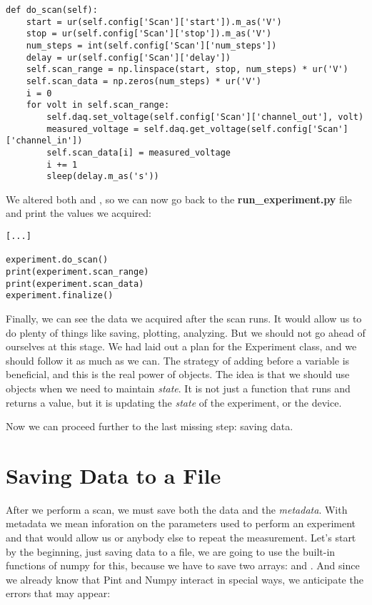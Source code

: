\begin{verbatim}
def do_scan(self):
    start = ur(self.config['Scan']['start']).m_as('V')
    stop = ur(self.config['Scan']['stop']).m_as('V')
    num_steps = int(self.config['Scan']['num_steps'])
    delay = ur(self.config['Scan']['delay'])
    self.scan_range = np.linspace(start, stop, num_steps) * ur('V')
    self.scan_data = np.zeros(num_steps) * ur('V')
    i = 0
    for volt in self.scan_range:
        self.daq.set_voltage(self.config['Scan']['channel_out'], volt)
        measured_voltage = self.daq.get_voltage(self.config['Scan']['channel_in'])
        self.scan_data[i] = measured_voltage
        i += 1
        sleep(delay.m_as('s'))
\end{verbatim}

We altered both  and , so we can now go back to the \textbf{run\_experiment.py} file and print the values we acquired:

\begin{verbatim}
[...]

experiment.do_scan()
print(experiment.scan_range)
print(experiment.scan_data)
experiment.finalize()
\end{verbatim}

Finally, we can see the data we acquired after the scan runs. It would allow us to do plenty of things like saving, plotting, analyzing. But we should not go ahead of ourselves at this stage. We had laid out a plan for the Experiment class, and we should follow it as much as we can. The strategy of adding  before a variable is beneficial, and this is the real power of objects. The idea is that we should use objects when we need to maintain \emph{state}. It is not just a function that runs and returns a value, but it is updating the \emph{state} of the experiment, or the device.

Now we can proceed further to the last missing step: saving data.

\section{Saving Data to a File}\label{sec:saving-data}
After we perform a scan, we must save both the data and the \emph{metadata}. With metadata we mean inforation on the parameters used to perform an experiment and that would allow us or anybody else to repeat the measurement. Let's start by the beginning, just saving data to a file, we are going to use the built-in functions of numpy for this, because we have to save two arrays:  and . And since we already know that Pint and Numpy interact in special ways, we anticipate the errors that may appear:

